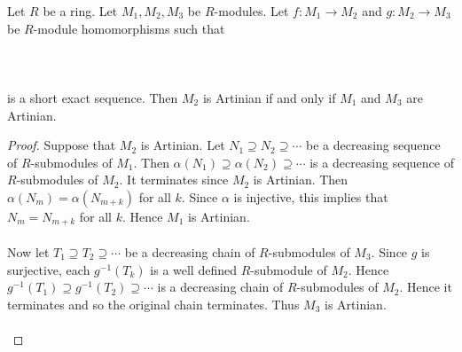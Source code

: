 \documentclass[a4paper]{article}
\begin{document}
\begin{prp}{}{} Let $R$ be a ring. Let $M_1,M_2,M_3$ be $R$-modules. Let $f:M_1\to M_2$ and $g:M_2\to M_3$ be $R$-module homomorphisms such that \\~\\
\\~\\
is a short exact sequence. Then $M_2$ is Artinian if and only if $M_1$ and $M_3$ are Artinian. \tcbline
\begin{proof}
Suppose that $M_2$ is Artinian. Let $N_1\supseteq N_2\supseteq\cdots$ be a decreasing sequence of $R$-submodules of $M_1$. Then $\alpha(N_1)\supseteq\alpha(N_2)\supseteq\cdots$ is a decreasing sequence of $R$-submodules of $M_2$. It terminates since $M_2$ is Artinian. Then $\alpha(N_m)=\alpha(N_{m+k})$ for all $k$. Since $\alpha$ is injective, this implies that $N_m=N_{m+k}$ for all $k$. Hence $M_1$ is Artinian. \\~\\

Now let $T_1\supseteq T_2\supseteq\cdots$ be a decreasing chain of $R$-submodules of $M_3$. Since $g$ is surjective, each $g^{-1}(T_k)$ is a well defined $R$-submodule of $M_2$. Hence $g^{-1}(T_1)\supseteq g^{-1}(T_2)\supseteq\cdots$ is a decreasing chain of $R$-submodules of $M_2$. Hence it terminates and so the original chain terminates. Thus $M_3$ is Artinian. \\~\\


\end{proof}
\end{prp}
\end{document}

